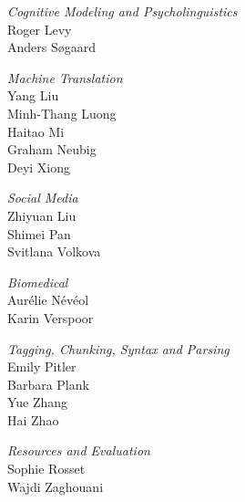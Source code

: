 \emph{Cognitive Modeling and Psycholinguistics} \\
\hspace*{0.2in} Roger Levy \\
\hspace*{0.2in} Anders Søgaard

\emph{Machine Translation} \\
\hspace*{0.2in} Yang Liu \\
\hspace*{0.2in} Minh-Thang Luong \\
\hspace*{0.2in} Haitao Mi \\
\hspace*{0.2in} Graham Neubig \\
\hspace*{0.2in} Deyi Xiong

\emph{Social Media} \\
\hspace*{0.2in} Zhiyuan Liu \\
\hspace*{0.2in} Shimei Pan \\
\hspace*{0.2in} Svitlana Volkova

\emph{Biomedical} \\
\hspace*{0.2in} Aurélie Névéol \\
\hspace*{0.2in} Karin Verspoor

\emph{Tagging, Chunking, Syntax and Parsing} \\
\hspace*{0.2in} Emily Pitler \\
\hspace*{0.2in} Barbara Plank \\
\hspace*{0.2in} Yue Zhang \\
\hspace*{0.2in} Hai Zhao

\emph{Resources and Evaluation} \\
\hspace*{0.2in} Sophie Rosset \\
\hspace*{0.2in} Wajdi Zaghouani
